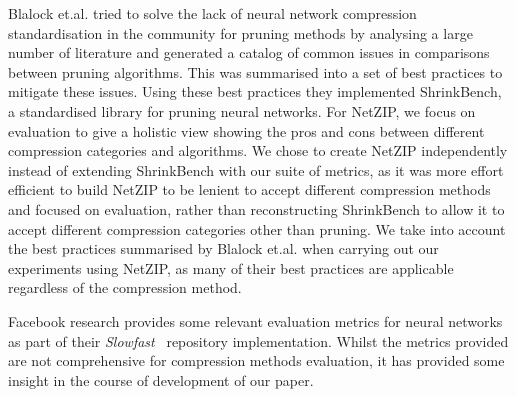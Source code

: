 Blalock et.al.\cite{Blalock2020} tried to solve the lack of neural network compression standardisation in the community for pruning methods by analysing a large number of literature and generated a catalog of common issues in comparisons between pruning algorithms.
%
This was summarised into a set of best practices to mitigate these issues. Using these best practices they implemented ShrinkBench, a standardised library for pruning neural networks. 
%
%
For NetZIP, we focus on evaluation to give a holistic view showing the pros and cons between different compression categories and algorithms. 
%
We chose to create NetZIP independently instead of extending ShrinkBench with our suite of metrics, as it was more effort efficient to build NetZIP to be lenient to accept different compression methods and focused on evaluation, rather than reconstructing ShrinkBench to allow it to accept different compression categories other than pruning. 
%
We take into account the best practices summarised by Blalock et.al.\cite{Blalock2020} when carrying out our experiments using NetZIP, as many of their best practices are applicable regardless of the compression method.
%

Facebook research provides some relevant evaluation metrics for neural networks as part of their \textit{Slowfast}~\cite{fan2020pyslowfast} repository implementation. Whilst the metrics provided are not comprehensive for compression methods evaluation, it has provided some insight in the course of development of our paper.

